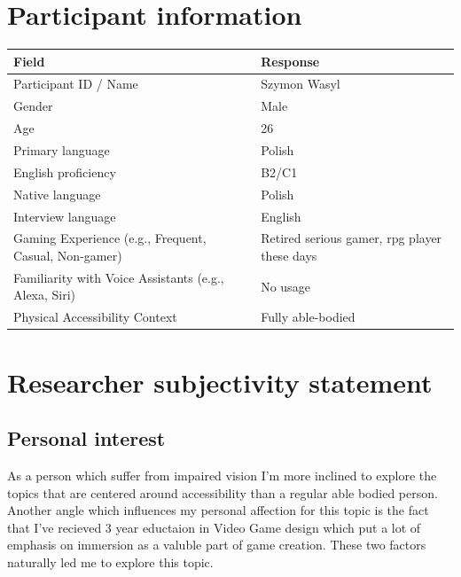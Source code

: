 \section{Participant information}
\begin{table}[h]
\centering
\begin{tabular}{|p{5cm}|p{10cm}|}
\hline
\textbf{Field} & \textbf{Response} \\ \hline
Participant ID / Name & Szymon Wasyl \\[1.5cm] \hline
Gender & Male \\[1.5cm] \hline
Age & 26 \\[1.5cm] \hline
Primary language & Polish \\[1.5cm] \hline
English proficiency & B2/C1 \\[1.5cm] \hline
Native language & Polish \\[1.5cm] \hline
Interview language & English \\[1.5cm] \hline
Gaming Experience (e.g., Frequent, Casual, Non-gamer) & Retired serious gamer, rpg player these days \\[1.5cm] \hline %
Familiarity with Voice Assistants (e.g., Alexa, Siri) & No usage  \\[1.5cm] \hline
Physical Accessibility Context & Fully able-bodied \\[2cm] \hline
\end{tabular}
\end{table}


\section{Researcher subjectivity statement}

\subsection{Personal interest}

    As a person which suffer from impaired vision I'm more inclined to explore the topics that are centered around accessibility than a regular able bodied person.
Another angle which influences my personal affection for this topic is the fact that I've recieved 3 year eductaion in Video Game design which put a lot of emphasis on immersion
as a valuble part of game creation. These two factors naturally led me to explore this topic.
